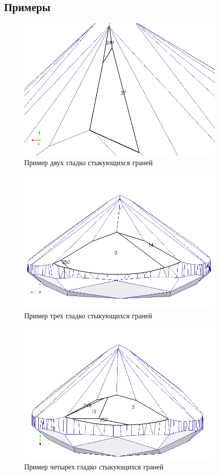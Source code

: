 \documentclass[a4paper,12pt, titlepage]{article}
\begin{document}
\subsection{Примеры} 
\begin{flushleft}
  \begin{figure}[h]
    \includegraphics[clip, width=10cm]{polyhedron-2010-11-25/example-37-249.png}
    \caption{Пример двух гладко стыкующихся граней}\label{poly-join-1}
  \end{figure}
\end{flushleft}
\begin{flushleft}
  \begin{figure}[h]
    \includegraphics[clip, width=10cm]{polyhedron-2010-11-25/example-0-14-250.png}
    \caption{Пример трех гладко стыкующихся граней}\label{poly-join-2}
  \end{figure}
\end{flushleft}
\begin{flushleft}
  \begin{figure}[h]
    \includegraphics[clip, width=10cm]{polyhedron-2010-11-25/example-3-13-248-252.png}
    \caption{Пример четырех гладко стыкующихся граней}\label{poly-join-4}
  \end{figure}
\end{flushleft}
\end{document}

